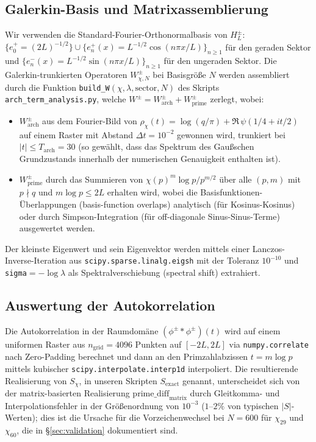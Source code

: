 \documentclass[a4paper,10pt,twocolumn]{article}
\theoremstyle{definition}
\theoremstyle{remark}
\newcommand{\chifn}{\chi}
\begin{document}
\subsection{Galerkin-Basis und Matrixassemblierung}
Wir verwenden die Standard-Fourier-Orthonormalbasis von $H_L^\pm$:
$\{e_0^+=(2L)^{-1/2}\}\cup\{e_n^+(x)=L^{-1/2}\cos(n\pi x/L)\}_{n\geq 1}$
für den geraden Sektor und
$\{e_n^-(x)=L^{-1/2}\sin(n\pi x/L)\}_{n\geq 1}$ für den ungeraden Sektor.
Die Galerkin-trunkierten Operatoren $W^{\pm}_{\chifn,N}$ bei Basisgröße
$N$ werden assembliert durch die Funktion
\texttt{build\_W}$(\chifn,\lambda,\mathrm{sector},N)$ des Skripts
\texttt{arch\_term\_analysis.py}, welche
$W^\pm = W^\pm_{\mathrm{arch}} + W^\pm_{\mathrm{prime}}$ zerlegt, wobei:
\begin{itemize}
\item[(i)] $W^\pm_{\mathrm{arch}}$ aus dem Fourier-Bild
  von $\rho_{\chifn}(t)=\log(q/\pi)+\Re\,\psi(1/4+it/2)$ auf einem Raster
  mit Abstand $\Delta t=10^{-2}$ gewonnen wird, trunkiert bei $|t|\leq T_{\mathrm{arch}}=
  30$ (so gewählt, dass das Spektrum des Gaußschen Grundzustands innerhalb
  der numerischen Genauigkeit enthalten ist).
\item[(ii)] $W^\pm_{\mathrm{prime}}$ durch das Summieren
  von $\chifn(p)^m\log p/p^{m/2}$ über alle $(p,m)$ mit $p\nmid q$ und
  $m\log p\leq 2L$ erhalten wird, wobei die Basisfunktionen-Überlappungen
  (basis-function overlaps) analytisch (für Kosinus-Kosinus) oder durch
  Simpson-Integration (für off-diagonale Sinus-Sinus-Terme) ausgewertet werden.
\end{itemize}
Der kleinste Eigenwert und sein Eigenvektor werden mittels einer
Lanczos-Inverse-Iteration aus \texttt{scipy.sparse.linalg.eigsh}
mit der Toleranz $10^{-10}$ und \texttt{sigma}$=-\log\lambda$ als
Spektralverschiebung (spectral shift) extrahiert.

\subsection{Auswertung der Autokorrelation}
Die Autokorrelation in der Raumdomäne
$(\phi^\pm\ast\phi^\pm)(t)$ wird auf einem uniformen Raster aus $n_{
\mathrm{grid}}=4096$ Punkten auf $[-2L,2L]$ via \texttt{numpy.correlate}
nach Zero-Padding berechnet und dann an den Primzahlabzissen
$t=m\log p$ mittels kubischer \texttt{scipy.interpolate.interp1d} interpoliert.
Die resultierende Realisierung von $S_{\chifn}$, in unseren Skripten
$S_{\mathrm{exact}}$ genannt, unterscheidet sich von der matrix-basierten Realisierung
$\mathrm{prime\_diff}_{\mathrm{matrix}}$ durch Gleitkomma- und
Interpolationsfehler in der Größenordnung von $10^{-3}$ ($1$--$2\%$ von typischen
$|S|$-Werten); dies ist die Ursache für die Vorzeichenwechsel bei $N=600$
für $\chifn_{29}$ und $\chifn_{60}$, die in
\S\ref{sec:validation} dokumentiert sind.
\end{document}
